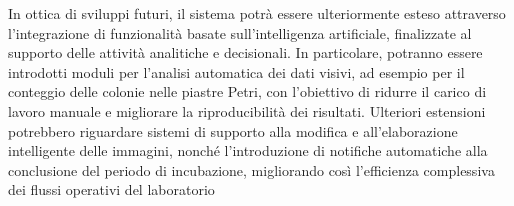 In ottica di sviluppi futuri, il sistema potrà essere ulteriormente esteso attraverso l’integrazione di funzionalità basate sull’intelligenza artificiale, finalizzate al supporto delle attività analitiche e decisionali. In particolare, potranno essere introdotti moduli per l’analisi automatica dei dati visivi, ad esempio per il conteggio delle colonie nelle piastre Petri, con l’obiettivo di ridurre il carico di lavoro manuale e migliorare la riproducibilità dei risultati. Ulteriori estensioni potrebbero riguardare sistemi di supporto alla modifica e all’elaborazione intelligente delle immagini, nonché l’introduzione di notifiche automatiche alla conclusione del periodo di incubazione, migliorando così l’efficienza complessiva dei flussi operativi del laboratorio